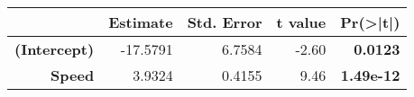 \begin{tabular}{rrrrr}
  \hline
 & Estimate & Std. Error & t value & Pr(>|t|) \\ 
  \hline
\textbf{(Intercept)} & -17.5791 & 6.7584 & -2.60 & \textbf{0.0123} \\ 
  \textbf{Speed} & 3.9324 & 0.4155 & 9.46 & \textbf{1.49e-12} \\ 
   \hline
\end{tabular}
